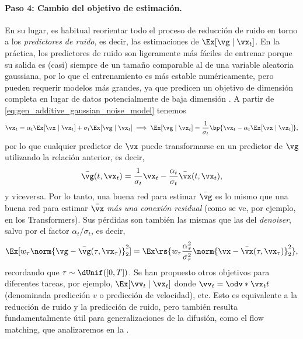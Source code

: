 \documentclass[../../book-main.tex]{subfiles}
\begin{document}
\paragraph{Paso 4: Cambio del objetivo de estimación.}
En su lugar, es habitual reorientar todo el proceso de reducción de ruido
en torno a los \textit{predictores de ruido}, es decir, las estimaciones de \(\Ex[\vg \mid
\vx_{t}]\). En la práctica, los predictores de ruido son ligeramente más fáciles de
entrenar porque su salida es (casi) siempre de un tamaño comparable al de una
variable aleatoria gaussiana, por lo que el entrenamiento es más estable numéricamente, pero
pueden requerir modelos más grandes, ya que predicen un
objetivo de dimensión completa en lugar de datos potencialmente de baja dimensión
\citep{li2025back}. A partir de \eqref{eq:gen_additive_gaussian_noise_model} tenemos
\begin{equation}
    \vx_{t} = \alpha_{t}\Ex[\vx \mid \vx_{t}] + \sigma_{t}\Ex[\vg
    \mid \vx_{t}] \implies \Ex[\vg \mid \vx_{t}] =
    \frac{1}{\sigma_{t}}\bp{\vx_{t} - \alpha_{t}\Ex[\vx \mid \vx_{t}]},
\end{equation}
por lo que cualquier predictor de \(\vx\) puede transformarse en un predictor
de \(\vg\) utilizando la relación anterior, es decir,
\begin{equation}
    \bar{\vg}(t, \vx_{t}) = \frac{1}{\sigma_{t}}\vx_{t} -
    \frac{\alpha_{t}}{\sigma_{t}}\bar{\vx}(t, \vx_{t}),
\end{equation}
y viceversa. Por lo tanto, una buena red para estimar \(\bar{\vg}\) es
lo mismo que una buena red para estimar \(\bar{\vx}\) \textit{más
una conexión residual} (como se ve, por ejemplo, en los Transformers). Sus pérdidas
son también las mismas que las del \textit{denoiser}, salvo por el factor
\(\alpha_{t}/\sigma_{t}\), es decir,
\begin{equation}
    \Ex[w_{\tau}\norm{\vg - \bar{\vg}(\tau,
    \vx_{\tau})}_{2}^{2}] =
    \Ex\rs{w_{\tau}\frac{\alpha_{\tau}^{2}}{\sigma_{\tau}^{2}}\norm{\vx
    - \bar{\vx}(\tau, \vx_{\tau})}_{2}^{2}},
\end{equation}
recordando que \(\tau \sim \dUnif([0, T])\). Se han propuesto otros objetivos
para diferentes tareas, por ejemplo, \(\Ex[\vv_{t} \mid
\vx_{t}]\) donde \(\vv_{t} = \odv*{\vx_{t}}{t}\) (denominada
predicción \(v\) o predicción de velocidad), etc. Esto es
equivalente a la reducción de ruido y la predicción de ruido, pero también resulta fundamentalmente
útil para generalizaciones de la difusión, como el flow matching, que
analizaremos en la .
\end{document}
